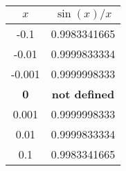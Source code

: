 \begin{tabular}{cc}
$x$ & $\sin(x)/x$ \\ \hline
 -0.1 & 0.9983341665 \\
 -0.01 & 0.9999833334 \\
 -0.001 & 0.9999998333 \\
 \textbf{0} & \textbf{not defined} \\
 0.001 & 0.9999998333 \\
 0.01 & 0.9999833334 \\
 0.1 & 0.9983341665
 \end{tabular}
